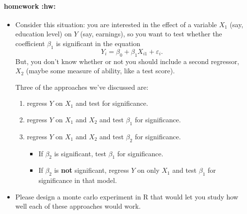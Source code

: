 \paragraph{homework \textbf{:hw:}}
\begin{itemize}
\item Consider this situation: you are interested in the effect of a
        variable $X_1$ (say, education level) on $Y$ (say, earnings),
        so you want to test whether the coefficient $\beta_{1}$ is
        significant in the equation
        \[ Y_{i} = \beta_{0} + \beta_{1} X_{i1} + \varepsilon_{i}. \]
        But, you don't know whether or not you should include a second
        regressor, $X_{2}$ (maybe some measure of ability, like a test
        score).

        Three of the approaches we've discussed are:
\begin{enumerate}
\item regress $Y$ on $X_{1}$ and test for significance.
\item regress $Y$ on $X_{1}$ and $X_{2}$ and test $\beta_{1}$ for
           significance.
\item regress $Y$ on $X_{1}$ and $X_{2}$ and test $\beta_{2}$ for
           significance.
\begin{itemize}
\item If $\beta_{2}$ is significant, test $\beta_{1}$ for
             significance.
\item If $\beta_{2}$ is \textbf{not} significant, regress $Y$ on only
             $X_{1}$ and test $\beta_{1}$ for significance in that
             model.
\end{itemize}
\end{enumerate}
\item Please design a monte carlo experiment in R that would let you
        study how well each of these approaches would work.
\end{itemize}

